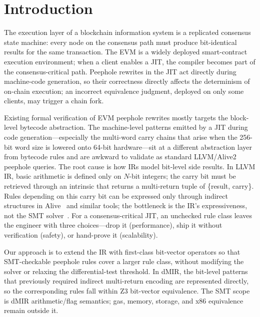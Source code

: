 \section{Introduction}

The execution layer of a blockchain information system is a replicated
consensus state machine: every node on the consensus path must produce
bit-identical results for the same transaction. The EVM is a widely
deployed smart-contract execution environment; when a client enables a
JIT, the compiler becomes part of the consensus-critical path.
Peephole rewrites in the JIT act directly during machine-code generation,
so their correctness directly affects the determinism of on-chain
execution; an incorrect equivalence judgment, deployed on only some
clients, may trigger a chain fork.

Existing formal verification of EVM peephole rewrites mostly targets
the block-level bytecode abstraction. The machine-level patterns
emitted by a JIT during code generation---especially the multi-word
carry chains that arise when the 256-bit word size is lowered onto
64-bit hardware---sit at a different abstraction layer from bytecode
rules and are awkward to validate as standard LLVM/Alive2 peephole
queries. The root cause is how IRs model bit-level side results. In
LLVM IR, basic arithmetic is defined only on $N$-bit
integers; the carry bit must be retrieved through an intrinsic that
returns a multi-return tuple of \{result, carry\}. Rules depending on
this carry bit can be expressed only through indirect structures in
Alive~\cite{alive} and similar tools; the bottleneck is the IR's
expressiveness, not the SMT solver~\cite{demoura2008z3}. For a
consensus-critical JIT, an unchecked rule class leaves the engineer
with three choices---drop it (performance), ship it without verification
(safety), or hand-prove it (scalability).

Our approach is to extend the IR with first-class bit-vector operators so
that SMT-checkable peephole rules cover a larger rule class, without
modifying the solver or relaxing the differential-test threshold. In
dMIR, the bit-level patterns that previously required indirect
multi-return encoding are represented directly, so the
corresponding rules fall within Z3 bit-vector equivalence. The SMT scope
is dMIR arithmetic/flag semantics; gas, memory, storage, and x86
equivalence remain outside it.

